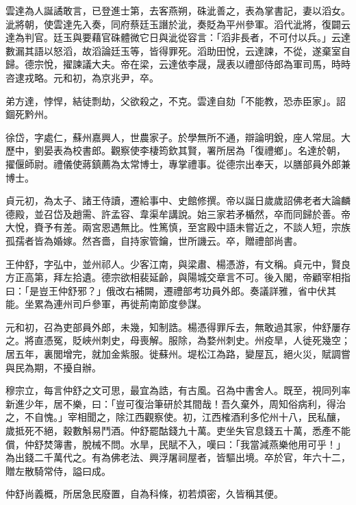 \begin{pinyinscope}
 雲達為人誕譎敢言，已登進士第，去客燕朔，硃泚善之，表為掌書記，妻以滔女。泚將朝，使雲達先入奏，同府蔡廷玉譖於泚，奏貶為平州參軍。滔代泚將，復闢云達為判官。廷玉與要藉官硃體微它日與泚從容言：「滔非長者，不可付以兵。」云達數漏其語以怒滔，故滔論廷玉等，皆得罪死。滔助田悅，云達諫，不從，遂棄室自歸。德宗悅，擢諫議大夫。帝在梁，云達依李晟，晟表以禮部侍郎為軍司馬，時時咨逮戎略。元和初，為京兆尹，卒。



 弟方達，悖悍，結徒剽劫，父欲殺之，不克。雲達自劾「不能教，恐赤臣家」。詔錮死黔州。



 徐岱，字處仁，蘇州嘉興人，世農家子。於學無所不通，辯論明銳，座人常屈。大歷中，劉晏表為校書郎。觀察使李棲筠欽其賢，署所居為「復禮鄉」。名達於朝，擢偃師尉。禮儀使蔣鎮薦為太常博士，專掌禮事。從德宗出奉天，以膳部員外郎兼博士。



 貞元初，為太子、諸王侍讀，遷給事中、史館修撰。帝以誕日歲歲詔佛老者大論麟德殿，並召岱及趙需、許孟容、韋渠牟講說。始三家若矛楯然，卒而同歸於善。帝大悅，賚予有差。兩宮恩遇無比。性篤慎，至宮殿中語未嘗近之，不談人短，宗族孤孺者皆為婚嫁。然吝嗇，自持家管鑰，世所譏云。卒，贈禮部尚書。



 王仲舒，字弘中，並州祁人。少客江南，與梁肅、楊憑游，有文稱。貞元中，賢良方正高第，拜左拾遺。德宗欲相裴延齡，與陽城交章言不可。後入閣，帝顧宰相指曰：「是豈王仲舒邪？」俄改右補闕，遷禮部考功員外郎。奏議詳雅，省中伏其能。坐累為連州司戶參軍，再徙荊南節度參謀。



 元和初，召為吏部員外郎，未幾，知制誥。楊憑得罪斥去，無敢過其家，仲舒屢存之。將直憑冤，貶峽州刺史，母喪解。服除，為婺州刺史。州疫旱，人徙死幾空；居五年，裏閭增完，就加金紫服。徙蘇州。堤松江為路，變屋瓦，絕火災，賦調嘗與民為期，不擾自辦。



 穆宗立，每言仲舒之文可思，最宜為誥，有古風。召為中書舍人。既至，視同列率新進少年，居不樂，曰：「豈可復治筆研於其間哉！吾久棄外，周知俗病利，得治之，不自愧。」宰相聞之，除江西觀察使。初，江西榷酒利多佗州十八，民私釀，歲抵死不絕，穀數斛易鬥酒。仲舒罷酤錢九十萬。吏坐失官息錢五十萬，悉產不能償，仲舒焚簿書，脫械不問。水旱，民賦不入，嘆曰：「我當減燕樂他用可乎！」為出錢二千萬代之。有為佛老法、興浮屠祠屋者，皆驅出境。卒於官，年六十二，贈左散騎常侍，謚曰成。



 仲舒尚義概，所居急民廢置，自為科條，初若煩密，久皆稱其便。




\end{pinyinscope}
